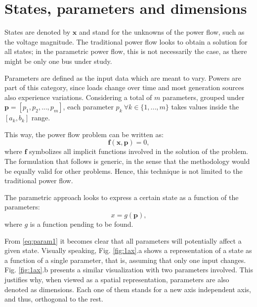 \section{States, parameters and dimensions}
States are denoted by $\mathbf{x}$ and stand for the unknowns of the power flow, such as the voltage magnitude. The traditional power flow looks to obtain a solution for all states; in the parametric power flow, this is not necessarily the case, as there might be only one bus under study. 

Parameters are defined as the input data which are meant to vary. Powers are part of this category, since loads change over time and most generation sources also experience variations. Considering a total of $m$ parameters, grouped under $\mathbf{p} = [p_1, p_2, ..., p_m]$, each parameter $p_k \ \forall k \in \{1, ..., m\}$ takes values inside the $[a_k, b_k]$ range. 

This way, the power flow problem can be written as:
\begin{equation}
  \mathbf{f}(\mathbf{x}, \mathbf{p}) = 0,
  \label{eq:power1}
\end{equation}
where $\mathbf{f}$ symbolizes all implicit functions involved in the solution of the problem. The formulation that follows is generic, in the sense that the methodology would be equally valid for other problems. Hence, this technique is not limited to the traditional power flow. 

The parametric approach looks to express a certain state as a function of the parameters:
\begin{equation}
  x = g(\mathbf{p}), 
  \label{eq:param1}
\end{equation}
where $g$ is a function pending to be found. 

From \eqref{eq:param1} it becomes clear that all parameters will potentially affect a given state. Visually speaking, Fig. \ref{fig:1ax}.a shows a representation of a state as a function of a single parameter, that is, assuming that only one input changes. Fig. \ref{fig:1ax}.b presents a similar visualization with two parameters involved. This justifies why, when viewed as a spatial representation, parameters are also denoted as dimensions. Each one of them stands for a new axis independent axis, and thus, orthogonal to the rest. 



